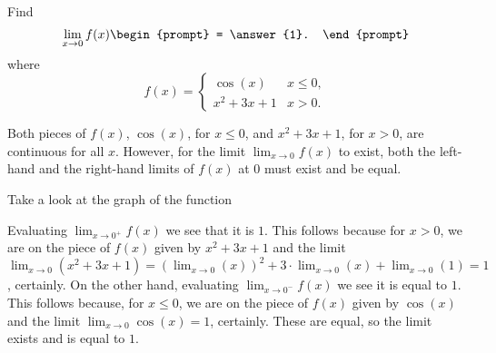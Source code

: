 \documentclass{ximera}
\author{Gregory Hartman \and Matthew Carr}
\begin{document}
\begin{exercise}



  Find 
  \[
  \lim_{x\to 0} f(x)
  \begin{prompt}
  = \answer{1}.
  \end{prompt}
  \]
  where
  \[
  f(x) = \begin{cases} \cos(x) & x\leq 0, \\ x^2+3x+1 & x>0. 
  \end{cases}
  \]
    \begin{hint}
     Both pieces of $f(x)$, $\cos(x)$, for $x\leq0$, and $x^2+3x+1$, for $x>0$, are continuous for all $x$. However, for the limit $\lim_{x\to0}f(x)$ to exist, both the left-hand and the right-hand limits of $f(x)$ at $0$ must exist and be equal.
    \end{hint}
     \begin{hint}
    	Take a look at the graph of the function
    \begin{center}
      \end{center} 
    \end{hint}
    \begin{hint}
     Evaluating $\lim_{x\to0^{+}}f(x)$ we see that it is $1$. This follows because for $x>0$, we are on the piece of $f(x)$ given by $x^2+3x+1$ and the limit $\lim_{x\to0}\left({x^2+3x+1}\right)=\left({\lim_{x\to0}(x)}\right)^2+3\cdot\lim_{x\to0}(x)+\lim_{x\to0}\left({1}\right)=1$, certainly. On the other hand, evaluating $\lim_{x\to0^{-}}f(x)$ we see it is equal to $1$. This follows because, for $x\leq0$, we are on the piece of $f(x)$ given by $\cos(x)$ and the limit $\lim_{x\to0}\cos(x)=1$, certainly. These are equal, so the limit exists and is equal to $1$.
    \end{hint}
\end{exercise}
\end{document}
